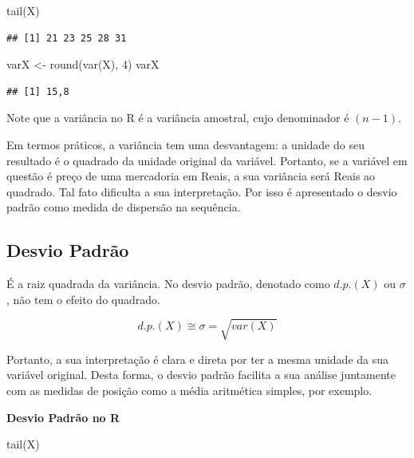 \documentclass[
]{book}
\newenvironment{Shaded}{\begin{snugshade}}{\end{snugshade}}
\newcommand{\DecValTok}[1]{\textcolor[rgb]{0.00,0.00,0.81}{#1}}
\newcommand{\FunctionTok}[1]{\textcolor[rgb]{0.00,0.00,0.00}{#1}}
\newcommand{\NormalTok}[1]{#1}
\newcommand{\OtherTok}[1]{\textcolor[rgb]{0.56,0.35,0.01}{#1}}
\begin{document}
\begin{Shaded}
\begin{Highlighting}[]
\FunctionTok{tail}\NormalTok{(X)}
\end{Highlighting}
\end{Shaded}

\begin{verbatim}
## [1] 21 23 25 28 31
\end{verbatim}

\begin{Shaded}
\begin{Highlighting}[]
\NormalTok{varX }\OtherTok{\textless{}{-}} \FunctionTok{round}\NormalTok{(}\FunctionTok{var}\NormalTok{(X), }\DecValTok{4}\NormalTok{)}
\NormalTok{varX}
\end{Highlighting}
\end{Shaded}

\begin{verbatim}
## [1] 15,8
\end{verbatim}

Note que a variância no R é a variância amostral, cujo denominador é \((n-1)\).

Em termos práticos, a variância tem uma desvantagem: a unidade do seu resultado é o quadrado da unidade original da variável. Portanto, se a variável em questão é preço de uma mercadoria em Reais, a sua variância será Reais ao quadrado. Tal fato dificulta a sua interpretação. Por isso é apresentado o desvio padrão como medida de dispersão na sequência.

\hypertarget{desvio-padruxe3o}{%
\subsection{Desvio Padrão}\label{desvio-padruxe3o}}

É a raiz quadrada da variância. No desvio padrão, denotado como \(d.p.(X)\) ou
\(\sigma\), não tem o efeito do quadrado.

\begin{equation*}
  d.p.(X) \cong \sigma = \sqrt{var(X)}
\end{equation*}

Portanto, a sua interpretação é clara e direta por ter a mesma unidade da sua variável original. Desta forma, o desvio padrão facilita a sua análise juntamente com as medidas de posição como a média aritmética simples, por exemplo.

\textbf{Desvio Padrão no R}

\begin{Shaded}
\begin{Highlighting}[]
\FunctionTok{tail}\NormalTok{(X)}
\end{Highlighting}
\end{Shaded}
\end{document}
